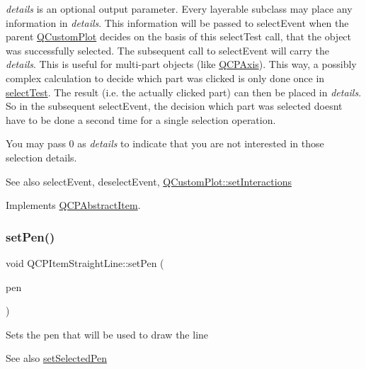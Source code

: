 {\itshape details} is an optional output parameter. Every layerable subclass may place any information in {\itshape details}. This information will be passed to select\+Event when the parent \hyperlink{class_q_custom_plot}{Q\+Custom\+Plot} decides on the basis of this select\+Test call, that the object was successfully selected. The subsequent call to select\+Event will carry the {\itshape details}. This is useful for multi-\/part objects (like \hyperlink{class_q_c_p_axis}{Q\+C\+P\+Axis}). This way, a possibly complex calculation to decide which part was clicked is only done once in \hyperlink{class_q_c_p_item_straight_line_a1e5d99d79efb5871600c72bcd2891a0f}{select\+Test}. The result (i.\+e. the actually clicked part) can then be placed in {\itshape details}. So in the subsequent select\+Event, the decision which part was selected doesn\textquotesingle{}t have to be done a second time for a single selection operation.

You may pass 0 as {\itshape details} to indicate that you are not interested in those selection details.

\begin{DoxySeeAlso}{See also}
select\+Event, deselect\+Event, \hyperlink{class_q_custom_plot_a5ee1e2f6ae27419deca53e75907c27e5}{Q\+Custom\+Plot\+::set\+Interactions} 
\end{DoxySeeAlso}


Implements \hyperlink{class_q_c_p_abstract_item_a96d522d10ffc0413b9a366c6f7f0476b}{Q\+C\+P\+Abstract\+Item}.

\hypertarget{class_q_c_p_item_straight_line_a9f36c9c9e60d7d9ac084c80380ac8601}{}\label{class_q_c_p_item_straight_line_a9f36c9c9e60d7d9ac084c80380ac8601} 
\subsubsection{\texorpdfstring{set\+Pen()}{setPen()}}
{\footnotesize\ttfamily void Q\+C\+P\+Item\+Straight\+Line\+::set\+Pen (\begin{DoxyParamCaption}\item[{const Q\+Pen \&}]{pen }\end{DoxyParamCaption})}

Sets the pen that will be used to draw the line

\begin{DoxySeeAlso}{See also}
\hyperlink{class_q_c_p_item_straight_line_a5c33559498d33543fa95cf0a36e851ff}{set\+Selected\+Pen} 
\end{DoxySeeAlso}
\hypertarget{class_q_c_p_item_straight_line_a5c33559498d33543fa95cf0a36e851ff}{}\label{class_q_c_p_item_straight_line_a5c33559498d33543fa95cf0a36e851ff} 
